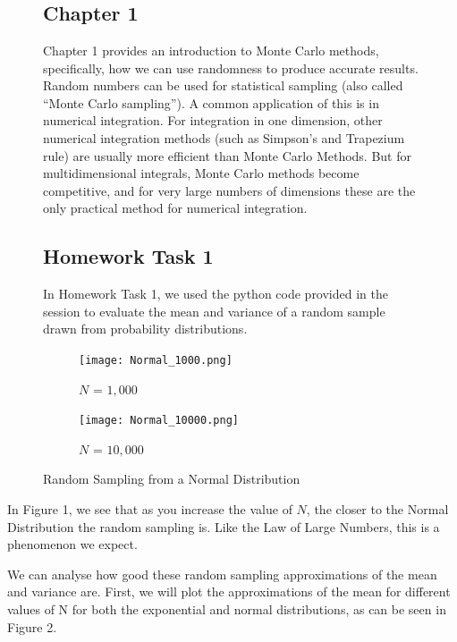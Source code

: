 \documentclass[12pt]{article}
\begin{document}
\begin{figure}[!tbp]

\section*{}
\medskip 
\subsection*{Chapter 1}
Chapter 1 provides an introduction to Monte Carlo methods, specifically, how we can use randomness to produce accurate results. Random numbers can be used for statistical sampling (also called “Monte Carlo sampling”). A common application of this is in numerical integration. For integration in one dimension, other numerical integration methods (such as Simpson’s and Trapezium rule) are usually more efficient than Monte Carlo Methods. But for multidimensional integrals, Monte Carlo methods become competitive, and for very large numbers of dimensions these are the only practical method for numerical integration.

\subsection*{Homework Task 1}
In Homework Task 1, we used the python code provided in the session to evaluate the mean and variance of a random sample drawn from probability distributions.
\medskip 
\medskip 

  \begin{subfigure}[b]{0.4\textwidth}
    \texttt{[image: Normal\_1000.png]}
    \caption{$N$ = $1,000$}
    \label{fig:f1}
  \end{subfigure}
  \hfill
  \begin{subfigure}[b]{0.41\textwidth}
    \texttt{[image: Normal\_10000.png]}
    \caption{$N$ = $10,000$}
    \label{fig:f2}
  \end{subfigure}
  \caption{Random Sampling from a Normal Distribution}
\end{figure}

In Figure 1, we see that as you increase the value of $N$, the closer to the Normal Distribution the random sampling is. Like the Law of Large Numbers, this is a phenomenon we expect. 

We can analyse how good these random sampling approximations of the mean and variance are. First, we will plot the approximations of the mean for different values of N for both the exponential and normal distributions, as can be seen in Figure 2. 
\end{document}
